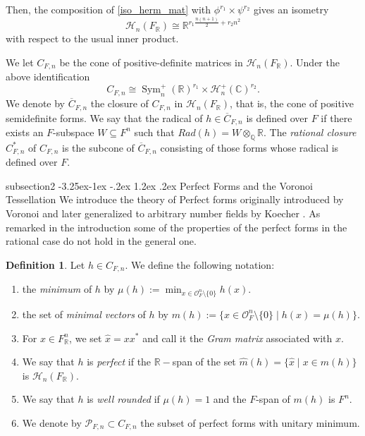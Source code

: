 \documentclass[11pt,a4paper,twoside]{amsart}
\makeatletter
\renewcommand{\subsection}{\@startsection
  {subsection}{2}{\z@}%
  {-3.25ex\@plus -1ex \@minus -.2ex}%
  {1.2ex \@plus .2ex}%
  {\normalfont\bfseries}}
\theoremstyle{plain}
\theoremstyle{definition}
\newtheorem{definition}[theorem]{\bfseries Definition}
\newcommand{\rint}[0]{\mathcal{O}_F}
\newcommand{\perfect}[0]{\mathcal{P}_}
\newcommand{\Her}[0]{\mathcal{H}_n(\fr)}
\newcommand{\fr}[0]{F_\mathbb{R}}
\makeatother
\begin{document}
Then, the composition of \eqref{iso_herm_mat} with $\phi^{r_1}
\times
\psi^{r_2}$ gives an isometry
\begin{equation}\label{isometry_vor_space_real}
    \Her \cong \mathbb{R}^{r_1\frac{n(n+1)}{2}+r_2n^2}
\end{equation}
with respect to the usual inner product. 

We let $C_{F,n}$ be the cone of positive-definite matrices in $\Her$. Under the above identification
$$C_{F,n} \cong \operatorname{Sym}^+_n(\mathbb{R})^{r_1}\times\mathcal{H}_n^+(\mathbb{C})^{r_2}.$$
We denote by $\overline{C}_{F,n}$ the closure of $C_{F,n}$ in $\Her$, that is, the cone of positive semidefinite forms. We say that the radical of $h\in\overline{C}_{F,n}$ is defined over $F$ if there exists an $F$-subspace $W\subseteq F^n$ such that $Rad(h)=W\otimes_{\mathbb Q}\mathbb R$. The \emph{rational closure} $C_{F,n}^{*}$ of $C_{F,n}$ is the subcone of $\overline{C}_{F,n}$ consisting of those forms whose radical is defined over $F$.


\subsection{Perfect Forms and the Voronoi Tessellation}
We introduce the theory of Perfect forms originally introduced by Voronoi \cite{Voronoi1908} and later generalized to arbitrary number fields by Koecher \cite{Koecher}. As remarked in the introduction some of the properties of the perfect forms in the rational case do not hold in the general one. 

\begin{definition}
\label{def_varias}
Let $h \in C_{F,n}$. We define the following notation:
\begin{enumerate}[label=(\roman*)]
    \item the \textit{minimum} of $h$ by
    $
        \mu(h) := \min_{x \in \rint^n \setminus \{0\}} h(x).
    $
    \item the set of \textit{minimal vectors} of $h$ by
    $
        m(h) := \{ x \in \rint^n \setminus \{0\} \mid h(x) = \mu(h) \}.
    $
    \item For $x\in \fr^n$, we set $\hat{x}=xx^*$ and call it the \textit{Gram matrix} associated with $x$.
    \item We say that $h$ is \textit{perfect} if the $\mathbb{R}-$span of the set
    $
        \widehat{m}(h)=\{ \hat x \mid x \in m(h) \}
    $
    is $\Her$.
    \item We say that $h$ is \textit{well rounded} if $\mu(h) = 1$ and the $F$-span of $m(h)$ is $F^n$.
    \item  We denote by $\perfect{F,n}  \subset C_{F,n}$ the subset of perfect forms with unitary minimum.
\end{enumerate}
\end{definition}
\end{document}
